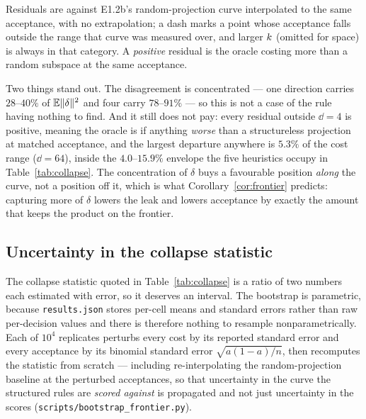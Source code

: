 Residuals are against E1.2b's random-projection curve interpolated to the same acceptance, with no
extrapolation; a dash marks a point whose acceptance falls outside the range that curve was measured
over, and larger $k$ (omitted for space) is always in that category. A \emph{positive} residual is
the oracle costing more than a random subspace at the same acceptance.

Two things stand out. The disagreement is concentrated --- one direction carries $28$--$40\%$ of
$\mathbb{E}\|\delta\|^2$ and four carry $78$--$91\%$ --- so this is not a case of the rule having nothing to
find. And it still does not pay: every residual outside $\dd{=}4$ is positive, meaning the oracle is
if anything \emph{worse} than a structureless projection at matched acceptance, and the largest
departure anywhere is $5.3\%$ of the cost range ($\dd{=}64$), inside the $4.0$--$15.9\%$ envelope the
five heuristics occupy in Table~\ref{tab:collapse}. The concentration of $\delta$ buys a favourable
position \emph{along} the curve, not a position off it, which is what
Corollary~\ref{cor:frontier} predicts: capturing more of $\delta$ lowers the leak and lowers
acceptance by exactly the amount that keeps the product on the frontier.

\subsection{Uncertainty in the collapse statistic}
\label{app:bootstrap}

The collapse statistic quoted in Table~\ref{tab:collapse} is a ratio of two numbers each estimated
with error, so it deserves an interval. The bootstrap is parametric, because
\texttt{results.json} stores per-cell means and standard errors rather than raw per-decision values
and there is therefore nothing to resample nonparametrically. Each of $10^4$ replicates perturbs
every cost by its reported standard error and every acceptance by its binomial standard error
$\sqrt{a(1-a)/n}$, then recomputes the statistic from scratch --- including re-interpolating the
random-projection baseline at the perturbed acceptances, so that uncertainty in the curve the
structured rules are \emph{scored against} is propagated and not just uncertainty in the scores
(\texttt{scripts/bootstrap\_frontier.py}).

